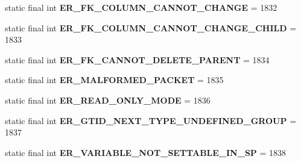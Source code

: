 \begin{DoxyCompactItemize}
\mbox{\label{classcom_1_1mysql_1_1cj_1_1exceptions_1_1_mysql_error_numbers_afe9e3c0f621b06d42bd77c7b38c994ac}} 
static final int {\bfseries E\+R\+\_\+\+F\+K\+\_\+\+C\+O\+L\+U\+M\+N\+\_\+\+C\+A\+N\+N\+O\+T\+\_\+\+C\+H\+A\+N\+GE} = 1832
\item 
\mbox{\label{classcom_1_1mysql_1_1cj_1_1exceptions_1_1_mysql_error_numbers_a286d2d79cc2293beaf73b5444956e428}} 
static final int {\bfseries E\+R\+\_\+\+F\+K\+\_\+\+C\+O\+L\+U\+M\+N\+\_\+\+C\+A\+N\+N\+O\+T\+\_\+\+C\+H\+A\+N\+G\+E\+\_\+\+C\+H\+I\+LD} = 1833
\item 
\mbox{\label{classcom_1_1mysql_1_1cj_1_1exceptions_1_1_mysql_error_numbers_adf741429b91f6829469380026b26ee37}} 
static final int {\bfseries E\+R\+\_\+\+F\+K\+\_\+\+C\+A\+N\+N\+O\+T\+\_\+\+D\+E\+L\+E\+T\+E\+\_\+\+P\+A\+R\+E\+NT} = 1834
\item 
\mbox{\label{classcom_1_1mysql_1_1cj_1_1exceptions_1_1_mysql_error_numbers_a94c9f348179797dcea2a37131221c67e}} 
static final int {\bfseries E\+R\+\_\+\+M\+A\+L\+F\+O\+R\+M\+E\+D\+\_\+\+P\+A\+C\+K\+ET} = 1835
\item 
\mbox{\label{classcom_1_1mysql_1_1cj_1_1exceptions_1_1_mysql_error_numbers_a2b575a530cfb6f0d809a8b0b197f0d6e}} 
static final int {\bfseries E\+R\+\_\+\+R\+E\+A\+D\+\_\+\+O\+N\+L\+Y\+\_\+\+M\+O\+DE} = 1836
\item 
\mbox{\label{classcom_1_1mysql_1_1cj_1_1exceptions_1_1_mysql_error_numbers_ac397f05854b1d7b89ad53c058bae7c4f}} 
static final int {\bfseries E\+R\+\_\+\+G\+T\+I\+D\+\_\+\+N\+E\+X\+T\+\_\+\+T\+Y\+P\+E\+\_\+\+U\+N\+D\+E\+F\+I\+N\+E\+D\+\_\+\+G\+R\+O\+UP} = 1837
\item 
\mbox{\label{classcom_1_1mysql_1_1cj_1_1exceptions_1_1_mysql_error_numbers_a6ad4a6e093aec8a33dfe29bb77da4b52}} 
static final int {\bfseries E\+R\+\_\+\+V\+A\+R\+I\+A\+B\+L\+E\+\_\+\+N\+O\+T\+\_\+\+S\+E\+T\+T\+A\+B\+L\+E\+\_\+\+I\+N\+\_\+\+SP} = 1838

\end{DoxyCompactItemize}
